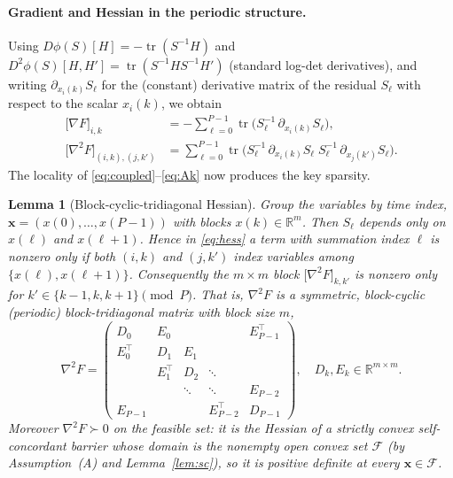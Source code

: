 \documentclass{amsart}
\newtheorem{lemma}{Lemma}
\newcommand{\R}{\mathbb{R}}
\newcommand{\tr}{\operatorname{tr}}
\begin{document}
\paragraph{Gradient and Hessian in the periodic structure.}
Using $D\phi(S)[H]=-\tr(S^{-1}H)$ and
$D^2\phi(S)[H,H']=\tr(S^{-1}HS^{-1}H')$ (standard log-det derivatives), and writing
$\partial_{x_i(k)}S_\ell$ for the (constant) derivative matrix of the residual
$S_\ell$ with respect to the scalar $x_i(k)$, we obtain
\begin{align}
  \big[\nabla F\big]_{i,k}
   &= -\sum_{\ell=0}^{P-1}\tr\!\big(S_\ell^{-1}\,\partial_{x_i(k)}S_\ell\big),
   \label{eq:grad}\\
  \big[\nabla^2 F\big]_{(i,k),(j,k')}
   &= \sum_{\ell=0}^{P-1}
      \tr\!\big(S_\ell^{-1}\,\partial_{x_i(k)}S_\ell\;
                S_\ell^{-1}\,\partial_{x_j(k')}S_\ell\big).
   \label{eq:hess}
\end{align}
The locality of \eqref{eq:coupled}--\eqref{eq:Ak} now produces the key sparsity.

\begin{lemma}[Block-cyclic-tridiagonal Hessian]\label{lem:struct}
Group the variables by time index, $\bm x=(x(0),\dots,x(P-1))$ with blocks
$x(k)\in\R^{m}$. Then $S_\ell$ depends only on $x(\ell)$ and $x(\ell+1)$. Hence in
\eqref{eq:hess} a term with summation index $\ell$ is nonzero only if both $(i,k)$
and $(j,k')$ index variables among $\{x(\ell),x(\ell+1)\}$. Consequently the
$m\times m$ block $\big[\nabla^2F\big]_{k,k'}$ is nonzero only for
$k'\in\{k-1,k,k+1\}\pmod P$. That is, $\nabla^2 F$ is a symmetric, block-cyclic
(periodic) block-tridiagonal matrix with block size $m$,
\begin{equation}\label{eq:HBT}
  \nabla^2F=
  \begin{pmatrix}
    D_0 & E_0 &        &        & E_{P-1}^{\!\top}\\
    E_0^{\!\top} & D_1 & E_1 &        & \\
        & E_1^{\!\top} & D_2 & \ddots & \\
        &        & \ddots & \ddots & E_{P-2}\\
    E_{P-1} &     &        & E_{P-2}^{\!\top} & D_{P-1}
  \end{pmatrix},
  \quad D_k,E_k\in\R^{m\times m}.
\end{equation}
Moreover $\nabla^2 F\succ0$ on the feasible set: it is the Hessian of a strictly
convex self-concordant barrier whose domain is the nonempty open convex set
$\mathcal F$ (by Assumption~(A) and Lemma~\ref{lem:sc}), so it is positive definite
at every $\bm x\in\mathcal F$.
\end{lemma}
\end{document}
